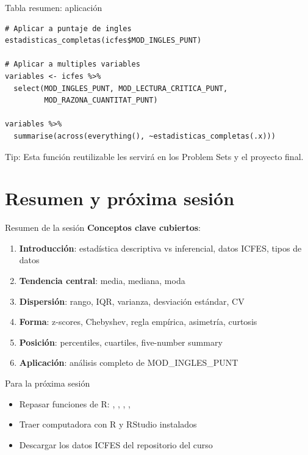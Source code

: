 \documentclass[aspectratio=169, 11pt]{beamer}
\begin{document}
\begin{frame}[fragile]{Tabla resumen: aplicación}
\begin{lstlisting}
# Aplicar a puntaje de ingles
estadisticas_completas(icfes$MOD_INGLES_PUNT)

# Aplicar a multiples variables
variables <- icfes %>%
  select(MOD_INGLES_PUNT, MOD_LECTURA_CRITICA_PUNT,
         MOD_RAZONA_CUANTITAT_PUNT)

variables %>%
  summarise(across(everything(), ~estadisticas_completas(.x)))
\end{lstlisting}

\vspace{0.5em}
\alert{Tip}: Esta función reutilizable les servirá en los Problem Sets y el proyecto final.
\end{frame}

\section{Resumen y próxima sesión}

\begin{frame}{Resumen de la sesión}
\textbf{Conceptos clave cubiertos}:

\begin{enumerate}
\item \textbf{Introducción}: estadística descriptiva vs inferencial, datos ICFES, tipos de datos
\item \textbf{Tendencia central}: media, mediana, moda
\item \textbf{Dispersión}: rango, IQR, varianza, desviación estándar, CV
\item \textbf{Forma}: z-scores, Chebyshev, regla empírica, asimetría, curtosis
\item \textbf{Posición}: percentiles, cuartiles, five-number summary
\item \textbf{Aplicación}: análisis completo de MOD\_INGLES\_PUNT
\end{enumerate}

\vspace{1em}
\begin{alertblock}{Para la próxima sesión}
\begin{itemize}
\item Repasar funciones de R: , , , , 
\item Traer computadora con R y RStudio instalados
\item Descargar los datos ICFES del repositorio del curso
\end{itemize}
\end{alertblock}
\end{frame}
\end{document}
